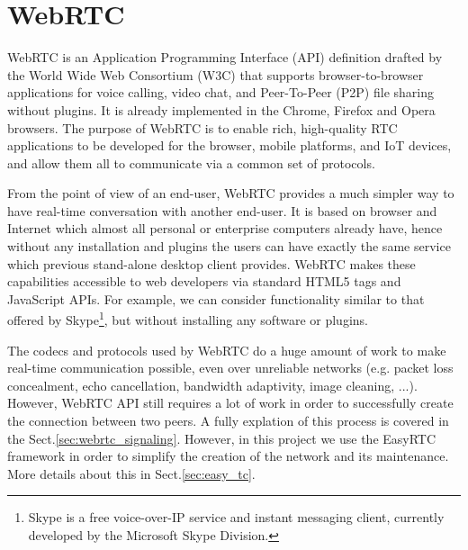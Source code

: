 \chapter{WebRTC}
\label{cha:webrtc}

WebRTC is an Application Programming Interface (API) definition drafted by the World Wide Web Consortium (W3C) that supports browser-to-browser applications for voice calling, video chat, and Peer-To-Peer (P2P) file sharing without plugins. It is already implemented in the Chrome, Firefox and Opera browsers. The purpose of WebRTC is to enable rich, high-quality RTC applications to be developed for the browser, mobile platforms, and IoT devices, and allow them all to communicate via a common set of protocols. 

From the point of view of an end-user, WebRTC provides a much simpler way to have real-time conversation with another end-user. It is based on browser and Internet which almost all personal or enterprise computers already have, hence without any installation and plugins the users can have exactly the same service which previous stand-alone desktop client provides. WebRTC makes these capabilities accessible to web developers via standard HTML5 tags and JavaScript APIs. For example, we can consider functionality similar to that offered by Skype\footnote{Skype is a free voice-over-IP service and instant messaging client, currently developed by the Microsoft Skype Division.}, but without installing any software or plugins. 

The codecs and protocols used by WebRTC do a huge amount of work to make real-time communication possible, even over unreliable networks (e.g. packet loss concealment, echo cancellation, bandwidth adaptivity, image cleaning, ...)\cite{started_with_webrtc}. However, WebRTC API still requires a lot of work in order to successfully create the connection between two peers. A fully explation of this process is covered in the Sect.\ref{sec:webrtc_signaling}. However, in this project we use the EasyRTC\cite{easyrtc} framework in order to simplify the creation of the network and its maintenance. More details about this in Sect.\ref{sec:easy_tc}.

